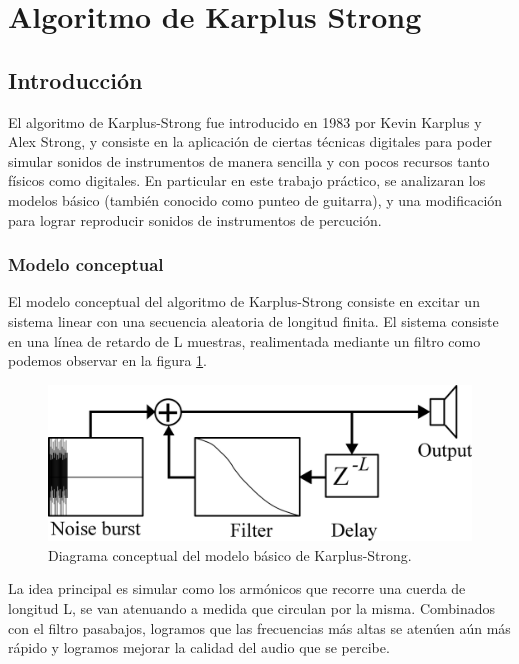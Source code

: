 \documentclass[../ASSD_TP2.tex]{subfiles}
\begin{document}
\section{Algoritmo de Karplus Strong }

\subsection{Introducción}

El algoritmo de Karplus-Strong fue introducido en 1983 por Kevin Karplus
y Alex Strong, y consiste en la aplicación de ciertas técnicas digitales
para poder simular sonidos de instrumentos de manera sencilla y con
pocos recursos tanto físicos como digitales. En particular en este
trabajo práctico, se analizaran los modelos básico (también conocido
como punteo de guitarra), y una modificación para lograr reproducir
sonidos de instrumentos de percución.

\subsubsection{Modelo conceptual}

El modelo conceptual del algoritmo de Karplus-Strong consiste en excitar
un sistema linear con una secuencia aleatoria de longitud finita.
El sistema consiste en una línea de retardo de L muestras, realimentada
mediante un filtro como podemos observar en la figura \ref{fig:Diagrama-conceptual-del}. 

\begin{figure}%
\centering{}\includegraphics[scale=0.15]{imagenes/Karplus-strong-schematic}\caption{Diagrama conceptual del modelo básico de Karplus-Strong.\label{fig:Diagrama-conceptual-del}}
\end{figure}%

La idea principal es simular como los armónicos que recorre una cuerda
de longitud L, se van atenuando a medida que circulan por la misma.
Combinados con el filtro pasabajos, logramos que las frecuencias más
altas se atenúen aún más rápido y logramos mejorar la calidad del
audio que se percibe.
\end{document}
